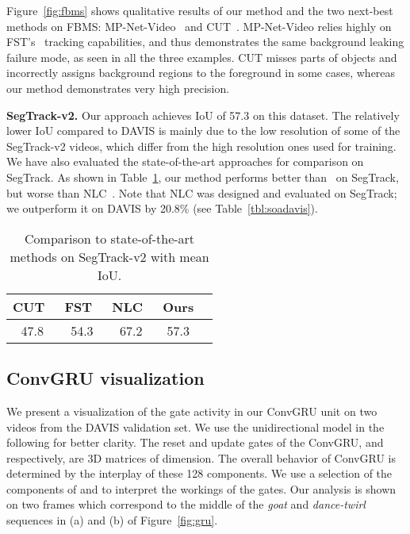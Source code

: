 \documentclass[10pt,twocolumn,letterpaper]{article}
\begin{document}
Figure~\ref{fig:fbms} shows qualitative results of our method and the two
next-best methods on FBMS: MP-Net-Video~\cite{tokmakov2016learning} and
CUT~\cite{keuper2015motion}. MP-Net-Video relies highly on
FST's~\cite{papazoglou2013fast} tracking capabilities, and thus demonstrates
the same background leaking failure mode, as seen in all the three examples.
CUT misses parts of objects and incorrectly assigns background regions to the
foreground in some cases, whereas our method demonstrates very high precision.

\vspace{0.3cm}\noindent\textbf{SegTrack-v2.}
Our approach achieves IoU of 57.3 on this dataset. The relatively lower IoU
compared to DAVIS is mainly due to the low resolution of some of the
SegTrack-v2 videos, which differ from the high resolution ones used for
training. We have also evaluated the state-of-the-art approaches for comparison
on SegTrack. As shown in Table~\ref{tbl:strck}, our method performs better
than~\cite{keuper2015motion,papazoglou2013fast} on SegTrack, but worse than
NLC~\cite{Faktor14}. Note that NLC was designed and evaluated on SegTrack; we
outperform it on DAVIS by 20.8\% (see Table~\ref{tbl:soadavis}).
\begin{table}[t]
\begin{center}
\begin{tabular}{c c c c c}
\hline
CUT~\cite{keuper2015motion} & FST~\cite{papazoglou2013fast} &  NLC~\cite{Faktor14}  & Ours \\
\hline
47.8 & 54.3  & 67.2 & 57.3  \\
\hline
\end{tabular}
\end{center}
\vspace{0.1cm}
\caption{Comparison to state-of-the-art methods on SegTrack-v2 with mean IoU.}
\label{tbl:strck}
\end{table}

\subsection{ConvGRU visualization}
\label{sec:gru}
We present a visualization of the gate activity in our ConvGRU unit on two
videos from the DAVIS validation set. We use the unidirectional model in the
following for better clarity. The reset and update gates of the ConvGRU, 
and  respectively, are 3D matrices of 
dimension.  The overall behavior of ConvGRU is determined by the interplay of
these 128 components. We use a selection of the components of 
and  to interpret the workings of the gates. Our analysis is shown on two frames which correspond
to the middle of the {\it goat} and {\it dance-twirl} sequences in (a) and (b)
of Figure~\ref{fig:gru}.
\end{document}
